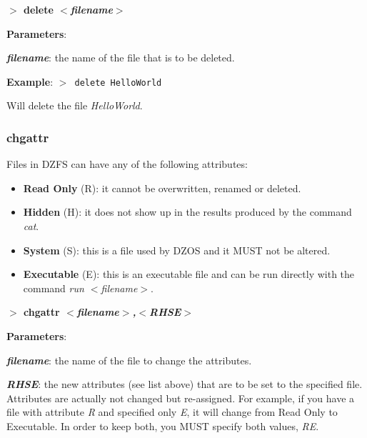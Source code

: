 \documentclass[a4paper,11pt]{article}
\begin{document}
        \hspace{1.9cm}\textbf{$>$ delete \textit{$<$filename$>$}}

        \textbf{Parameters}:

        \hspace{1cm}\textbf{\textit{filename}}: the name of the file that is to
        be deleted.
        
        \textbf{Example}: \texttt{$>$ delete HelloWorld}

        Will delete the file \textit{HelloWorld}.

        \subsubsection{{\color{blue}chgattr}}
        Files in DZFS can have any of the following attributes:
        
        \begin{itemize}
            \item \textbf{Read Only} (R): it cannot be overwritten, renamed or
            deleted.
            \item \textbf{Hidden} (H): it does not show up in the results
            produced by the command \textit{cat}.
            \item \textbf{System} (S): this is a file used by DZOS and it MUST
            not be altered.
            \item \textbf{Executable} (E): this is an executable file and can be
            run directly with the command \textit{run $<$filename$>$}.
        \end{itemize}

        \hspace{1.9cm}\textbf{$>$ chgattr \textit{$<$filename$>$,$<$RHSE$>$}}

        \textbf{Parameters}:

        \hspace{1cm}\textbf{\textit{filename}}: the name of the file to change
        the attributes.

        \hspace{1cm}\textbf{\textit{RHSE}}: the new attributes (see list above)
        that are to be set to the specified file. Attributes are actually not
        changed but re-assigned. For example, if you have a file with attribute
        \textit{R} and specified only \textit{E}, it will change from Read Only
        to Executable. In order to keep both, you MUST specify both values,
        \textit{RE}.
        
\end{document}
